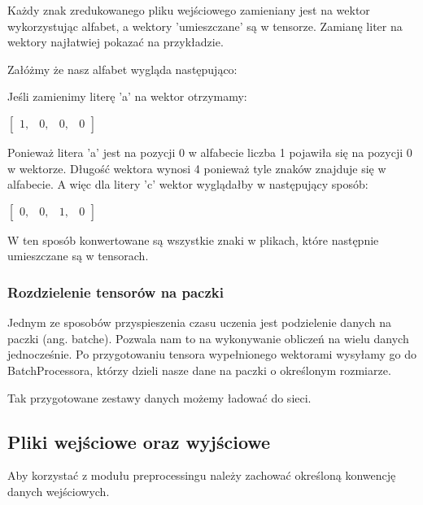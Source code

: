 Każdy znak zredukowanego pliku wejściowego zamieniany jest na wektor wykorzystując alfabet, 
a wektory 'umieszczane' są w tensorze. Zamianę liter na wektory najłatwiej pokazać na przykładzie.

Załóżmy że nasz alfabet wygląda następująco:

Jeśli zamienimy literę 'a' na wektor otrzymamy: 
 
\vspace{2mm}
$
\begin{bmatrix} 
1, & 0, & 0, & 0
\end{bmatrix} 
$
\vspace{2mm}

Ponieważ litera 'a' jest na pozycji 0 w alfabecie liczba 1 pojawiła się na pozycji 0 w wektorze.
Długość wektora wynosi 4 ponieważ tyle znaków znajduje się w alfabecie. A więc dla litery 
'c' wektor wyglądałby w następujący sposób:

\vspace{2mm}
$
\begin{bmatrix} 
0, & 0, & 1, & 0
\end{bmatrix} 
$
\vspace{2mm}

W ten sposób konwertowane są wszystkie znaki w plikach, które następnie umieszczane są w tensorach.


\subsubsection{Rozdzielenie tensorów na paczki}
Jednym ze sposobów przyspieszenia czasu uczenia jest podzielenie danych na paczki (ang. batche).
Pozwala nam to na wykonywanie obliczeń na wielu danych jednocześnie. Po przygotowaniu tensora wypełnionego wektorami
wysyłamy go do BatchProcessora, którzy dzieli nasze dane na paczki o określonym rozmiarze. 

\vspace{2mm}
Tak przygotowane zestawy danych możemy ładować do sieci.


\newpage
\subsection{Pliki wejściowe oraz wyjściowe}
Aby korzystać z modułu preprocessingu należy zachować określoną konwencję danych wejściowych. 

